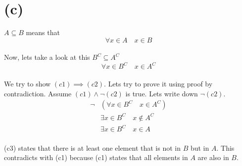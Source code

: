 \documentclass{article}
\begin{document}
\section*{(c)}
$A \subseteq B$ means that
\[
   \forall x \in A \quad x \in B \tag{c1}
\]
\\
Now, lets take a look at this $B^C \subseteq A^C$
\[
   \forall x \in B^C \quad x \in A^C \tag{c2}
\]
\\
We try to show $(c1) \implies (c2)$. Lets try to prove it using proof by contradiction.
Assume $(c1) \land \neg (c2)$ is true. Lets write down $\neg (c2)$.
\begin{align*}
   \neg & (\forall x \in B^C \quad x \in A^C)       \\
        & \exists x \in B^C \quad x \notin A^C      \\
        & \exists x \in B^C \quad x \in A  \tag{c3}
\end{align*}
\\
(c3) states that there is at least one element that is not in $B$ but in $A$.
This contradicts with (c1) because (c1) states that all elements in $A$ are also in $B$.
\end{document}
